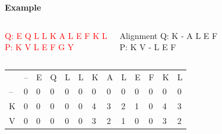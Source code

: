 \documentclass{bredelebeamer}
\begin{document}
\begin{frame}
\centering
  \begin{Large}
   \textbf{Example} \linebreak
  \end{Large}
\begin{columns}
\textcolor{red}{Q:  E Q L L K A L E F K L \\
P:  K V L E F G Y}

\begin{block}{Alignment}
Q:  K - A L E F \\
P:  K V - L E F
\end{block}
\end{columns}    

\begin{table}[]
\centering
\begin{tabular}{lllllllllllll}
                        & --                     & E                      & Q                      & L                      & L                                              & K                                              & A                                              & L                                              & E                                               & F                                               & K                       & L                       \\ \cline{2-13} 
\multicolumn{1}{l|}{--} & \multicolumn{1}{l|}{0} & \multicolumn{1}{l|}{0} & \multicolumn{1}{l|}{0} & \multicolumn{1}{l|}{0} & \multicolumn{1}{l|}{\cellcolor[HTML]{3166FF}0} & \multicolumn{1}{l|}{0}                         & \multicolumn{1}{l|}{0}                         & \multicolumn{1}{l|}{0}                         & \multicolumn{1}{l|}{0}                          & \multicolumn{1}{l|}{0}                          & \multicolumn{1}{l|}{0}  & \multicolumn{1}{l|}{0}  \\ \cline{2-13} 
\multicolumn{1}{l|}{K}  & \multicolumn{1}{l|}{0} & \multicolumn{1}{l|}{0} & \multicolumn{1}{l|}{0} & \multicolumn{1}{l|}{0} & \multicolumn{1}{l|}{0}                         & \multicolumn{1}{l|}{\cellcolor[HTML]{3166FF}4} & \multicolumn{1}{l|}{\cellcolor[HTML]{EFEFEF}3} & \multicolumn{1}{l|}{2}                         & \multicolumn{1}{l|}{1}                          & \multicolumn{1}{l|}{0}                          & \multicolumn{1}{l|}{4}  & \multicolumn{1}{l|}{3}  \\ \cline{2-13} 
\multicolumn{1}{l|}{V}  & \multicolumn{1}{l|}{0} & \multicolumn{1}{l|}{0} & \multicolumn{1}{l|}{0} & \multicolumn{1}{l|}{0} & \multicolumn{1}{l|}{0}                         & \multicolumn{1}{l|}{\cellcolor[HTML]{3166FF}3} & \multicolumn{1}{l|}{\cellcolor[HTML]{3166FF}2} & \multicolumn{1}{l|}{1}                         & \multicolumn{1}{l|}{0}                          & \multicolumn{1}{l|}{0}                          & \multicolumn{1}{l|}{3}  & \multicolumn{1}{l|}{2}  \\ \cline{2-13} 

\end{tabular}
\end{table}
\end{frame}
\end{document}
